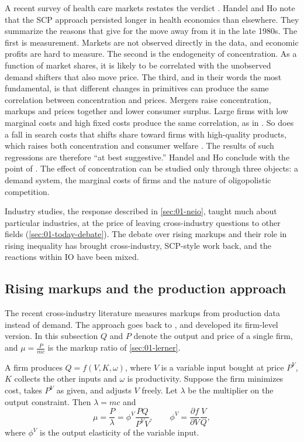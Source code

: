 A recent survey of health care markets restates the verdict \citep[p.~527]{HandelHo2021}. Handel and Ho note
that the SCP approach persisted longer in health economics than elsewhere. They summarize the reasons that
\citet{BerryGaynorScottMorton2019} give for the move away from it in the late 1980s. The first is measurement.
Markets are not observed directly in the data, and economic profits are hard to measure. The second is the
endogeneity of concentration. As a function of market shares, it is likely to be correlated with the unobserved
demand shifters that also move price. The third, and in their words the most fundamental, is that different
changes in primitives can produce the same correlation between concentration and prices. Mergers raise
concentration, markups and prices together and lower consumer surplus. Large firms with low marginal costs and
high fixed costs produce the same correlation, as in \citet{Demsetz1973}. So does a fall in search costs that
shifts share toward firms with high-quality products, which raises both concentration and consumer welfare
\citep{AutorEtAl2020}. The results of such regressions are therefore ``at best suggestive.'' Handel and Ho
conclude with the point of \citet{Bresnahan1989}. The effect of concentration can be studied only through three
objects: a demand system, the marginal costs of firms and the nature of oligopolistic competition.

Industry studies, the response described in \cref{sec:01-neio}, taught
much about particular industries, at the price of leaving cross-industry questions to other fields
(\cref{sec:01-today-debate}). The debate over rising markups and their role in rising inequality has
brought cross-industry, SCP-style work back, and the reactions within IO have been mixed.

\subsection{Rising markups and the production approach}\label{sec:01-rising-markups}

The recent cross-industry literature measures markups from production data instead of demand. The
approach goes back to \citet{Hall1988}, and \citet{DeLoeckerWarzynski2012} developed its firm-level
version. In this subsection $Q$ and $P$ denote the output and price of a single firm, and $\mu =
\frac{P}{mc}$ is the markup ratio of \cref{sec:01-lerner}.

\begin{proposition}\label{prop:01-production-markup}
A firm produces $Q = f(V, K, \omega)$, where $V$ is a variable input bought at price $P^V$, $K$ collects
the other inputs and $\omega$ is productivity. Suppose the firm minimizes cost, takes $P^V$ as given,
and adjusts $V$ freely. Let $\lambda$ be the multiplier on the output constraint. Then $\lambda = mc$ and
\[
\mu = \frac{P}{\lambda} = \phi^V \frac{PQ}{P^V V}, \qquad
\phi^V = \frac{\partial f}{\partial V} \frac{V}{Q},
\]
where $\phi^V$ is the output elasticity of the variable input.
\end{proposition}

